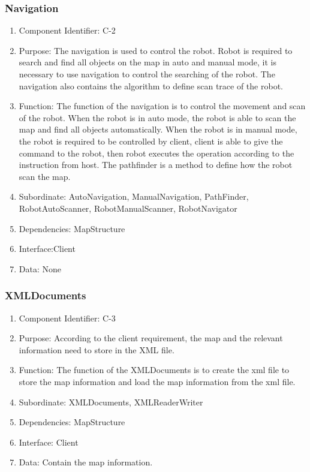 \documentclass[11pt, a4paper]{report}
\begin{document}
\subsubsection{Navigation}
\begin{enumerate}
\item Component Identifier: C-2
\item Purpose: The navigation is used to control the robot. Robot is required to search and find all objects on the map in auto and manual mode, it is necessary to use navigation to control the searching of the robot. The navigation also contains the algorithm to define scan trace of the robot. 
\item Function: The function of the navigation is to control the movement and scan of the robot. When the robot is in auto mode, the robot is able to scan the map and find all objects automatically. When the robot is in manual mode, the robot is required to be controlled by client, client is able to give the command to the robot, then robot executes the operation according to the instruction from host. The pathfinder is a method to define how the robot scan the map. 
\item Subordinate: AutoNavigation, ManualNavigation, PathFinder, RobotAutoScanner, RobotManualScanner, RobotNavigator
\item Dependencies: MapStructure
\item Interface:Client
\item Data: None
\end{enumerate}

\subsubsection{XMLDocuments}
\begin{enumerate}
\item Component Identifier: C-3
\item Purpose: According to the client requirement, the map and the relevant information need to store in the XML file. 
\item Function: The function of the XMLDocuments is to create the xml file to store the map information and load the map information from the xml file. 
\item Subordinate: XMLDocuments, XMLReaderWriter
\item Dependencies: MapStructure
\item Interface: Client
\item Data: Contain the map information.
\end{enumerate}
\end{document}
